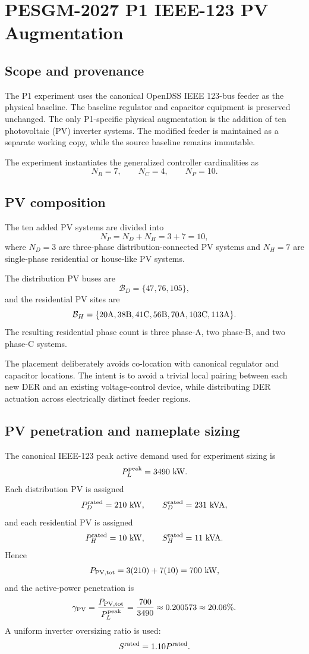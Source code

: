 \section{PESGM-2027 P1 IEEE-123 PV Augmentation}
\label{sec:p1_ieee123_pv_augmentation}

\subsection{Scope and provenance}
The P1 experiment uses the canonical OpenDSS IEEE 123-bus feeder as the physical
baseline. The baseline regulator and capacitor equipment is preserved unchanged.
The only P1-specific physical augmentation is the addition of ten photovoltaic
(PV) inverter systems. The modified feeder is maintained as a separate working
copy, while the source baseline remains immutable.

The experiment instantiates the generalized controller cardinalities as
\[
N_R = 7,\qquad N_C = 4,\qquad N_P = 10.
\]

\subsection{PV composition}
The ten added PV systems are divided into
\[
N_P = N_D + N_H = 3 + 7 = 10,
\]
where $N_D=3$ are three-phase distribution-connected PV systems and $N_H=7$ are
single-phase residential or house-like PV systems.

The distribution PV buses are
\[
\mathcal B_D = \{47,76,105\},
\]
and the residential PV sites are
\[
\mathcal B_H =
\{20{\rm A},38{\rm B},41{\rm C},56{\rm B},70{\rm A},103{\rm C},113{\rm A}\}.
\]
The resulting residential phase count is three phase-A, two phase-B, and two
phase-C systems.

The placement deliberately avoids co-location with canonical regulator and
capacitor locations. The intent is to avoid a trivial local pairing between each
new DER and an existing voltage-control device, while distributing DER actuation
across electrically distinct feeder regions.

\subsection{PV penetration and nameplate sizing}
The canonical IEEE-123 peak active demand used for experiment sizing is
\[
P_L^{\rm peak}=3490~{\rm kW}.
\]
Each distribution PV is assigned
\[
P_D^{\rm rated}=210~{\rm kW},\qquad
S_D^{\rm rated}=231~{\rm kVA},
\]
and each residential PV is assigned
\[
P_H^{\rm rated}=10~{\rm kW},\qquad
S_H^{\rm rated}=11~{\rm kVA}.
\]
Hence
\[
P_{\rm PV,tot}=3(210)+7(10)=700~{\rm kW},
\]
and the active-power penetration is
\[
\gamma_{\rm PV}
=
\frac{P_{\rm PV,tot}}{P_L^{\rm peak}}
=
\frac{700}{3490}
\approx 0.200573
\approx 20.06\%.
\]
A uniform inverter oversizing ratio is used:
\[
S^{\rm rated}=1.10P^{\rm rated}.
\]

